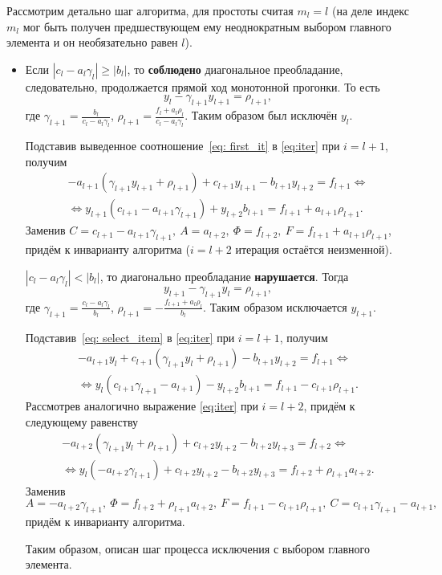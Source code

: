 Рассмотрим детально шаг алгоритма, для простоты считая \(m_l=l\) (на деле индекс \(m_l\) мог быть получен предшествующем ему неоднократным выбором главного элемента и он необязательно равен \(l\)).
\begin{itemize}
\item Если \(|c_l-a_l\gamma_l|\geq |b_l|\), то \textbf{соблюдено} диагональное преобладание, следовательно, продолжается прямой ход монотонной прогонки.
То есть
\begin{equation}
\label{eq: first_it}
    y_l-\gamma_{l+1}y_{l+1}=\rho_{l+1},
\end{equation}
где \(\gamma_{l+1}=\frac{b_l}{c_l-a_l \gamma_l}\), \(\rho_{l+1}=\frac{f_{l}+a_{l}\rho_{l}}{c_l-a_l\gamma_l}\). Таким образом был исключён \(y_l\).

Подставив выведенное соотношение~\eqref{eq: first_it}  в \eqref{eq:iter} при \(i=l+1\), получим
\begin{align}
    -a_{l+1}(\gamma_{l+1}y_{l+1}+\rho_{l+1})+c_{l+1}y_{l+1}-b_{l+1}y_{l+2}=f_{l+1} \Leftrightarrow \\ 
    \Leftrightarrow y_{l+1} (c_{l+1}-a_{l+1}\gamma_{l+1})+y_{l+2}b_{l+1}=f_{l+1}+a_{l+1}\rho_{l+1}.
\end{align}
Заменив \(C=c_{l+1}-a_{l+1}\gamma_{l+1}, \ A=a_{l+2}, \ \Phi=f_{l+2}, \ F=f_{l+1} + a_{l+1} \rho_{l+1}\),  придём к инварианту алгоритма (\(i=l+2\) итерация остаётся неизменной).

 \(|c_l-a_l \gamma_l|<|b_l|\), то диагонально преобладание \textbf{нарушается}. Тогда
\begin{equation}
    \label{eq: select_item}
    y_{l+1} -\gamma_{l+1} y_{l}=\rho_{l+1},
\end{equation}
где \(\gamma_{l+1}=\frac{c_l-a_l\gamma_l}{b_l}\), \(\rho_{l+1}=-\frac{f_{l+1}+a_l\rho_l}{b_l}\). Таким образом исключается \(y_{l+1}\). 

Подставив~\eqref{eq: select_item}  в \eqref{eq:iter} при \(i=l+1\), получим
\begin{align*}
    -a_{l+1}y_l+c_{l+1}(\gamma_{l+1}y_l+\rho_{l+1})-b_{l+1}y_{l+2}=f_{l+1} \Leftrightarrow \\ \Leftrightarrow y_l (c_{l+1} \gamma_{l+1}-a_{l+1})-y_{l+2}b_{l+1}=f_{l+1}-c_{l+1}\rho_{l+1}.
\end{align*}
Рассмотрев аналогично выражение \eqref{eq:iter} при \(i=l+2\), придём к следующему равенству
\begin{align*}
    -a_{l+2}(\gamma_{l+1}y_l+\rho_{l+1})+c_{l+2}y_{l+2}-b_{l+2}y_{l+3}=f_{l+2} \Leftrightarrow \\
    \Leftrightarrow  y_{l}(-a_{l+2}\gamma_{l+1})+c_{l+2}y_{l+2}-b_{l+2}y_{l+3}=f_{l+2}+\rho_{l+1}a_{l+2}.
\end{align*}
Заменив \(A=-a_{l+2}\gamma_{l+1}, \ \Phi=f_{l+2}+\rho_{l+1}a_{l+2}, \ F=f_{l+1}-c_{l+1}\rho_{l+1}, \ C = c_{l+1} \gamma_{l+1} - a_{l+1},\) придём к инварианту алгоритма.

Таким образом, описан шаг процесса исключения с выбором главного элемента.
\end{itemize}

